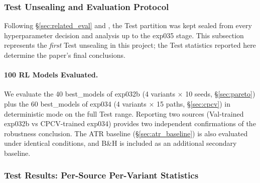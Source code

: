 \documentclass[11pt, a4paper]{article}
\begin{document}
\subsubsection{Test Unsealing and Evaluation Protocol}
\label{sec:oos_setup}

Following \S\ref{sec:related_eval} and \citet{gort2022backtest}, the Test
partition was kept sealed from every hyperparameter decision and analysis up
to the exp035 stage. This subsection represents the \emph{first} Test
unsealing in this project; the Test statistics
reported here determine the paper's final conclusions.

\paragraph{100 RL Models Evaluated.}
We evaluate the 40 best\_models of exp032b (4 variants $\times$ 10 seeds,
\S\ref{sec:pareto}) plus the 60 best\_models of exp034 (4 variants $\times$
15 paths, \S\ref{sec:cpcv}) in deterministic mode on the full Test range.
Reporting two sources (Val-trained exp032b vs CPCV-trained exp034) provides
two independent confirmations of the robustness conclusion. The ATR baseline
(\S\ref{sec:atr_baseline}) is also evaluated under identical conditions, and
B\&H is included as an additional secondary baseline.

\subsubsection{Test Results: Per-Source Per-Variant Statistics}
\label{sec:oos_results}
\end{document}
